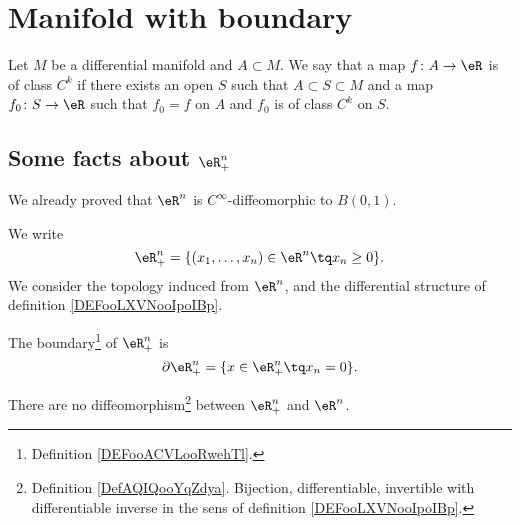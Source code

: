 \section{Manifold with boundary}


\begin{definition}	\label{DEFooLXVNooIpoIBp}
	Let \( M\) be a differential manifold and \( A\subset M\). We say that a map \(f \colon A\to \eR  \) is of class \( C^k\) if there exists an open \( S\) such that \( A\subset S\subset M\) and a map \(f_0 \colon S\to \eR  \) such that \( f_0=f\) on \( A\) and \( f_0\) is of class \( C^k\) on \( S\).
\end{definition}

\subsection{Some facts about \( \eR^n_+\)}

We already proved that \( \eR^n\) is \( C^{\infty}\)-diffeomorphic to \( B(0,1)\).

We write
\begin{equation}
	\eR_+^n=\{ (x_1,\ldots,x_n)\in \eR^n\tq x_n\geq 0 \}.
\end{equation}
We consider the topology induced from \( \eR^n\), and the differential structure of definition \ref{DEFooLXVNooIpoIBp}.

\begin{lemma}	\label{LEMooBICBooFUQyYA}
	The boundary\footnote{Definition \ref{DEFooACVLooRwehTl}.} of \( \eR^n_+\) is
	\begin{equation}
		\partial \eR^n_+=\{ x\in \eR^n_+\tq x_n=0 \}.
	\end{equation}
\end{lemma}


\begin{proposition}	\label{PROPooPUREooSkeyxs}
	There are no diffeomorphism\footnote{Definition \ref{DefAQIQooYqZdya}. Bijection, differentiable, invertible with differentiable inverse in the sens of definition \ref{DEFooLXVNooIpoIBp}.} between \( \eR^n_+\) and \( \eR^n\).
\end{proposition}

